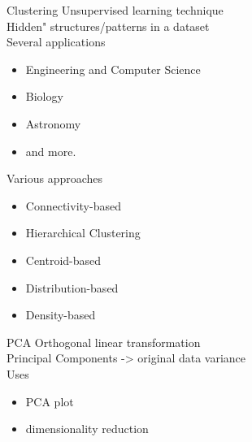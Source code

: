 \begin{frame}{Clustering} \pause
    Unsupervised learning technique \\ \pause
    \vspace{0.2cm}
    Hidden" structures/patterns in a dataset \\ \pause
    \vspace{0.2cm}
    Several applications \\ \pause
    \begin{itemize}
        \item Engineering and Computer Science \pause
        \item Biology \pause
        \item Astronomy \pause
        \item and more. \pause
    \end{itemize}
    Various approaches \pause
    \begin{itemize}
        \item Connectivity-based \pause
        \item Hierarchical Clustering \pause
        \item Centroid-based \pause
        \item Distribution-based \pause
        \item Density-based
    \end{itemize}
\end{frame}


\begin{frame}{PCA}
    Orthogonal linear transformation \\ \pause
    \vspace{0.5cm}
    Principal Components \pause -> original data variance \\ \pause
    \vspace{0.5cm}
    Uses \pause
    \begin{itemize}
        \item PCA plot \pause
        \item dimensionality reduction
    \end{itemize}
\end{frame}

%

